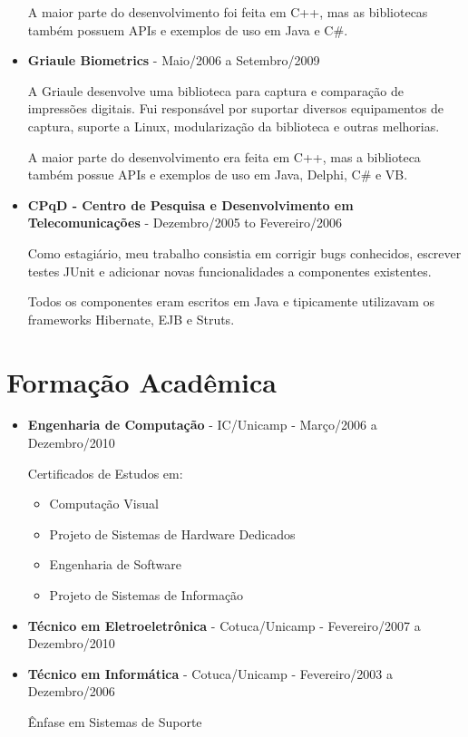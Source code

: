 \documentclass[a4paper,10pt]{article}
\begin{document}
\begin{itemize}
        A maior parte do desenvolvimento foi feita em C++, mas as bibliotecas também possuem APIs e exemplos de uso em Java e C\#.

      \item
        \textbf{Griaule Biometrics} - Maio/2006 a Setembro/2009
        
        A Griaule desenvolve uma biblioteca para captura e comparação de impressões digitais. Fui responsável por suportar diversos equipamentos de captura, suporte a Linux, modularização da biblioteca e outras melhorias.
        
        A maior parte do desenvolvimento era feita em C++, mas a biblioteca também possue APIs e exemplos de uso em Java, Delphi, C\# e VB.

      \item
        \textbf{CPqD - Centro de Pesquisa e Desenvolvimento em Telecomunicações} - Dezembro/2005 to Fevereiro/2006

        Como estagiário, meu trabalho consistia em corrigir bugs conhecidos, escrever testes JUnit e adicionar novas funcionalidades a componentes existentes.

        Todos os componentes eram escritos em Java e tipicamente utilizavam os frameworks Hibernate, EJB e Struts.
    \end{itemize}

  \section{Formação Acadêmica}
    \begin{itemize}
      \item  
        \textbf{Engenharia de Computação} - IC/Unicamp - Março/2006 a Dezembro/2010

        Certificados de Estudos em:
        \begin{itemize}
          \item Computação Visual
          \item Projeto de Sistemas de Hardware Dedicados
          \item Engenharia de Software
          \item Projeto de Sistemas de Informação
        \end{itemize}



      \item  
        \textbf{Técnico em Eletroeletrônica} - Cotuca/Unicamp - Fevereiro/2007 a Dezembro/2010


      \item  
        \textbf{Técnico em Informática} - Cotuca/Unicamp - Fevereiro/2003 a Dezembro/2006

        Ênfase em Sistemas de Suporte


    \end{itemize}
    
\end{document}
